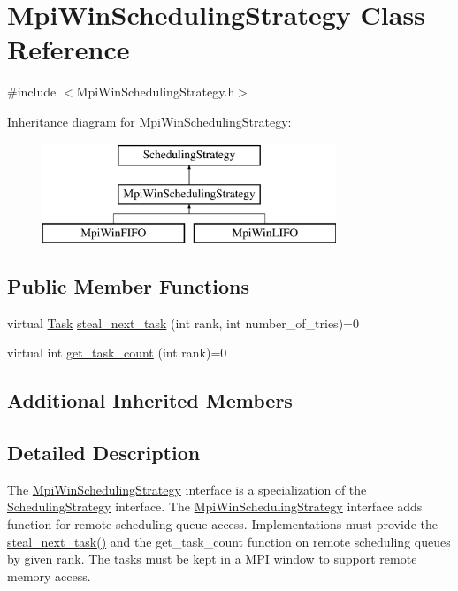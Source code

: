 \hypertarget{class_mpi_win_scheduling_strategy}{}\section{Mpi\+Win\+Scheduling\+Strategy Class Reference}
\label{class_mpi_win_scheduling_strategy}


{\ttfamily \#include $<$Mpi\+Win\+Scheduling\+Strategy.\+h$>$}

Inheritance diagram for Mpi\+Win\+Scheduling\+Strategy\+:\begin{figure}[H]
\begin{center}
\leavevmode
\includegraphics[height=3.000000cm]{class_mpi_win_scheduling_strategy}
\end{center}
\end{figure}
\subsection*{Public Member Functions}
\begin{DoxyCompactItemize}
\item 
virtual \hyperlink{_types_8h_a0c77930ab3818a1680c59353f627fba8}{Task} \hyperlink{class_mpi_win_scheduling_strategy_ac1804574e61c9ed91c7f78bc48b332ea}{steal\+\_\+next\+\_\+task} (int rank, int number\+\_\+of\+\_\+tries)=0
\item 
virtual int \hyperlink{class_mpi_win_scheduling_strategy_a8742d0d3a2204efe5aa47e39f856dee1}{get\+\_\+task\+\_\+count} (int rank)=0
\end{DoxyCompactItemize}
\subsection*{Additional Inherited Members}


\subsection{Detailed Description}
The \hyperlink{class_mpi_win_scheduling_strategy}{Mpi\+Win\+Scheduling\+Strategy} interface is a specialization of the \hyperlink{class_scheduling_strategy}{Scheduling\+Strategy} interface. The \hyperlink{class_mpi_win_scheduling_strategy}{Mpi\+Win\+Scheduling\+Strategy} interface adds function for remote scheduling queue access. Implementations must provide the \hyperlink{class_mpi_win_scheduling_strategy_ac1804574e61c9ed91c7f78bc48b332ea}{steal\+\_\+next\+\_\+task()} and the get\+\_\+task\+\_\+count function on remote scheduling queues by given rank. The tasks must be kept in a M\+P\+I window to support remote memory access.

